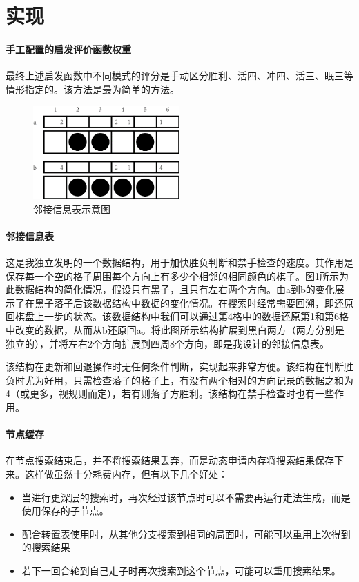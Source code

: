 \documentclass{ctexart}
\begin{document}
\section{实现}

\paragraph{手工配置的启发评价函数权重} 最终上述启发函数中不同模式的评分是手动区分胜利、活四、冲四、活三、眠三等情形指定的。该方法是最为简单的方法。

\begin{figure}
    \centering
    \includegraphics[width=0.5\textwidth]{assets/adjTable.png}
    \caption{邻接信息表示意图}
    \label{fig:adj}
\end{figure}

\paragraph{邻接信息表} 这是我独立发明的一个数据结构，用于加快胜负判断和禁手检查的速度。其作用是保存每一个空的格子周围每个方向上有多少个相邻的相同颜色的棋子。图\ref{fig:adj}所示为此数据结构的简化情况，假设只有黑子，且只有左右两个方向。由a到b的变化展示了在黑子落子后该数据结构中数据的变化情况。在搜索时经常需要回溯，即还原回棋盘上一步的状态。该数据结构中我们可以通过第4格中的数据还原第1和第6格中改变的数据，从而从b还原回a。将此图所示结构扩展到黑白两方（两方分别是独立的），并将左右2个方向扩展到四周8个方向，即是我设计的邻接信息表。

该结构在更新和回退操作时无任何条件判断，实现起来非常方便。该结构在判断胜负时尤为好用，只需检查落子的格子上，有没有两个相对的方向记录的数据之和为4（或更多，视规则而定），若有则落子方胜利。该结构在禁手检查时也有一些作用。

\paragraph{节点缓存} 在节点搜索结束后，并不将搜索结果丢弃，而是动态申请内存将搜索结果保存下来。这样做虽然十分耗费内存，但有以下几个好处：
\begin{itemize}
    \item 当进行更深层的搜索时，再次经过该节点时可以不需要再运行走法生成，而是使用保存的子节点。
    \item 配合转置表使用时，从其他分支搜索到相同的局面时，可能可以重用上次得到的搜索结果
    \item 若下一回合轮到自己走子时再次搜索到这个节点，可能可以重用搜索结果。    
\end{itemize}
\end{document}
